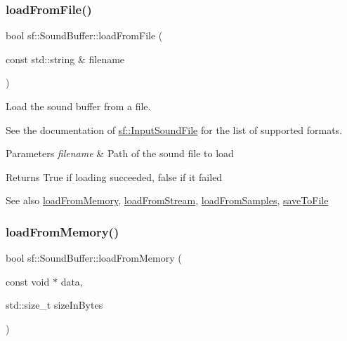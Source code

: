 \subsubsection{\texorpdfstring{load\+From\+File()}{loadFromFile()}}
{\footnotesize\ttfamily bool sf\+::\+Sound\+Buffer\+::load\+From\+File (\begin{DoxyParamCaption}\item[{const std\+::string \&}]{filename }\end{DoxyParamCaption})}



Load the sound buffer from a file. 

See the documentation of \hyperlink{classsf_1_1_input_sound_file}{sf\+::\+Input\+Sound\+File} for the list of supported formats.


\begin{DoxyParams}{Parameters}
{\em filename} & Path of the sound file to load\\
\hline
\end{DoxyParams}
\begin{DoxyReturn}{Returns}
True if loading succeeded, false if it failed
\end{DoxyReturn}
\begin{DoxySeeAlso}{See also}
\hyperlink{classsf_1_1_sound_buffer_af8cfa5599739a7edae69c5cba273d33f}{load\+From\+Memory}, \hyperlink{classsf_1_1_sound_buffer_ad292156b1e01f6dabd4c0c277d5e079e}{load\+From\+Stream}, \hyperlink{classsf_1_1_sound_buffer_a42d51ce4bb3b60c7ea06f63c273fd063}{load\+From\+Samples}, \hyperlink{classsf_1_1_sound_buffer_aade64260c6375580a085314a30be007e}{save\+To\+File} 
\end{DoxySeeAlso}
\mbox{\label{classsf_1_1_sound_buffer_af8cfa5599739a7edae69c5cba273d33f}} 
\subsubsection{\texorpdfstring{load\+From\+Memory()}{loadFromMemory()}}
{\footnotesize\ttfamily bool sf\+::\+Sound\+Buffer\+::load\+From\+Memory (\begin{DoxyParamCaption}\item[{const void $\ast$}]{data,  }\item[{std\+::size\+\_\+t}]{size\+In\+Bytes }\end{DoxyParamCaption})}



